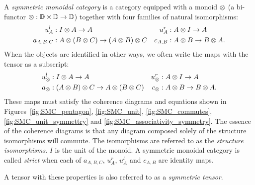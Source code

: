 \begin{definition}\label{symmetricmonoidalcat}
  A \emph{symmetric monoidal category}\cite{barr:ctcs,maclan97:categorieswrkmath} \cD{} is a
  category equipped with a monoid $\otimes$ (a bi-functor $\otimes:\mathbb{D} \times \mathbb{D} \to \mathbb{D}$) together with
  four families of natural isomorphisms:
  \begin{align*}
    u^l_{A}&:I\otimes A \to A&
    u^r_{A}&:A\otimes I\to A \\
    a_{A,B,C} &: A\otimes(B\otimes C) \to (A\otimes B)\otimes C &
    c_{A,B}&:A\otimes B \to B\otimes A.
  \end{align*}
  When the objects are identified in other ways, we often write the maps with the tensor as a
  subscript:
  \begin{align*}
    u_{\otimes}^l &: I \otimes A \to A &
    u_{\otimes}^r &: A \otimes I \to A\\
    a_\otimes &: (A \otimes B) \otimes C \to A \otimes (B \otimes C) &
    c_\otimes &: A \otimes B \to B \otimes A.
  \end{align*}
  These maps must satisfy the coherence diagrams and equations shown in
  Figures~\ref{fig:SMC_pentagon}, \ref{fig:SMC_unit}, \ref{fig:SMC_commutes},
  \ref{fig:SMC_unit_symmettry} and \ref{fig:SMC_associativity_symmetry}. The essence of the
  coherence diagrams is that any diagram composed solely of the structure isomorphisms will
  commute. The isomorphisms are referred to as the \emph{structure isomorphisms}. $I$ is the
  unit of the monoid. A symmetric monoidal category is called \emph{strict} when each of
  $a_{A,B,C}$, $u^r_{A}$, $u^l_{A}$ and $c_{A,B}$ are identity maps.

  A tensor with these properties is also referred to as a \emph{symmetric tensor}.
\end{definition}

